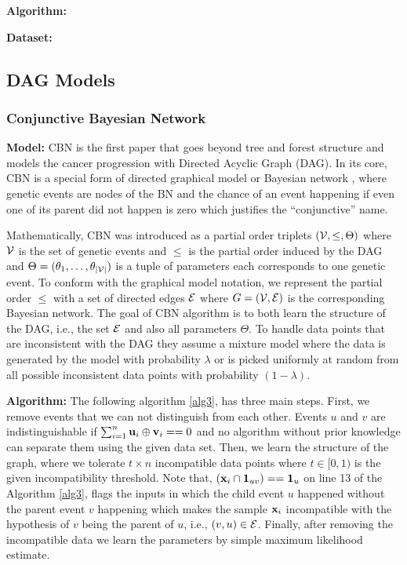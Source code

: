 	{\bf Algorithm:}
	
	{\bf Dataset:}
	
	
	\subsection{DAG Models}

	\subsubsection{Conjunctive Bayesian Network \cite{beerenwinkel07}}
	{\bf Model:}
	CBN \cite{beerenwinkel07} is the first paper that goes beyond tree and forest structure and models the cancer progression with Directed Acyclic Graph (DAG). 
	In its core, CBN is a special form of directed graphical model or Bayesian network \cite{?}, where genetic events are nodes of the BN and the chance of an event happening if even one of its parent did not happen is zero which justifies the ``conjunctive'' name. 
	
	Mathematically, CBN was introduced \cite{beerenwinkel07} as a partial order triplets $({\cal V}, \leq, \Theta)$ where ${\cal V}$ is the set of genetic events and $\leq$ is the partial order induced by the DAG and $\Theta = (\theta_1, \dots, \theta_{|{\cal V}|} )$ is a tuple of parameters each corresponds to one genetic event. 
	To conform with the graphical model notation, we represent the partial order $\leq$ with a set of directed edges ${\cal E}$ where $G = ({\cal V}, {\cal E})$ is the corresponding Bayesian network. 
	The goal of CBN algorithm is to both learn the structure of the DAG, i.e., the set ${\cal E}$ and also all parameters $\Theta$. 	
	To handle data points that are inconsistent with the DAG they assume a mixture model where the data is generated by the model with probability $\lambda$ or is picked uniformly at random from all possible inconsistent data points with probability $(1 - \lambda)$. 
	
	{\bf Algorithm:}
	The following algorithm \ref{alg3}, has three main steps. 
	First, we remove events that we can not distinguish from each other.  
	Events $u$ and $v$ are indistinguishable if $\sum_{i = 1}^{n} \mathbf{u}_i \oplus \mathbf{v}_i == 0$ and no algorithm without prior knowledge can separate them using the given data set.
	Then, we learn the structure of the graph, where we tolerate $t \times n$ incompatible data points where $t \in [0,1)$ is the given incompatibility threshold. 
	Note that, $(\mathbf{x}_i \cap {\large \bf 1}_{uv}) == {\large \bf 1}_{u}$ on line 13 of the Algorithm \ref{alg3}, flags the inputs in which the child event $u$ happened without the parent event $v$ happening which makes the sample $\mathbf{x}_i$ incompatible with the hypothesis of $v$ being the parent of $u$, i.e., $(v, u) \in {\cal E}$. 
	Finally, after removing the incompatible data we learn the parameters by simple maximum likelihood estimate. 
	
